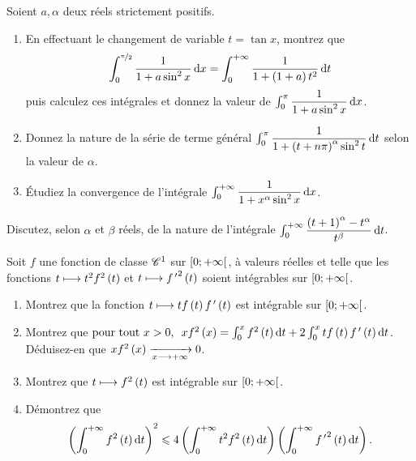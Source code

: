 \begin{exoss}
Soient \(a,\alpha\) deux réels strictement positifs.

\begin{enumerate}
    \item En effectuant le changement de variable \(t=\tan x\), montrez que \[\int_0^{\nicefrac{\pi}{2}}\dfrac{1}{1+a\sin^2x}\odif{x}=\int_0^{\pinf}\dfrac{1}{1+\paren{1+a}t^2}\odif{t}\] puis calculez ces intégrales et donnez la valeur de \(\int_0^\pi\dfrac{1}{1+a\sin^2x}\odif{x}\). \\
    \item Donnez la nature de la série de terme général \(\int_0^\pi\dfrac{1}{1+\paren{t+n\pi}^\alpha\sin^2t}\odif{t}\) selon la valeur de \(\alpha\). \\
    \item Étudiez la convergence de l'intégrale \(\int_0^{\pinf}\dfrac{1}{1+x^\alpha\sin^2x}\odif{x}\).
\end{enumerate}
\end{exoss}

\begin{exoss}
Discutez, selon \(\alpha\) et \(\beta\) réels, de la nature de l'intégrale \(\int_0^{\pinf}\dfrac{\paren{t+1}^\alpha-t^\alpha}{t^\beta}\odif{t}\).
\end{exoss}

\begin{exoss}
Soit \(f\) une fonction de classe \(\mathscr{C}^{1}\) sur \(\left[0;+\infty\right[\), à valeurs réelles et telle que les fonctions \(t\longmapsto t^2f^2\left(t\right)\) et \(t\longmapsto{f^{\,\prime}}^2\left(t\right)\) soient intégrables sur \(\left[0;+\infty\right[\).

\begin{enumerate}
    \item Montrez que la fonction \(t\longmapsto tf\left(t\right)f^{\,\prime}\left(t\right)\) est intégrable sur \(\left[0;+\infty\right[\). \\
    \item Montrez que \(\quantifs{\tpt x>0}xf^2\paren{x}=\int_0^xf^2\paren{t}\odif{t}+2\int_0^xtf\paren{t}f\prim\paren{t}\odif{t}\). \\ Déduisez-en que \(xf^2\left(x\right)\xrightarrow[x\longrightarrow+\infty]{}0\). \\
    \item Montrez que \(t\longmapsto f^2\left(t\right)\) est intégrable sur \(\left[0;+\infty\right[\). \\
    \item Démontrez que \[\paren{\int_0^{\pinf}f^2\paren{t}\odif{t}}^2\leq4\paren{\int_0^{\pinf}t^2f^2\paren{t}\odif{t}}\paren{\int_0^{\pinf}{f\prim}^2\paren{t}\odif{t}}.\]
\end{enumerate}
\end{exoss}

